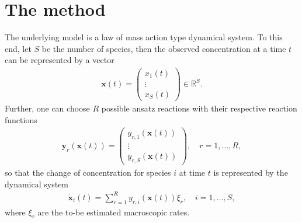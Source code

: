 \documentclass[oneside, abstracton, titlepage]{scrartcl}
\begin{document}
	\section{The method}
	The underlying model is a law of mass action type dynamical system. To this end, let $S$ be the number of species, then the observed concentration at a time $t$ can be represented by a vector
	\begin{align}
	\mathbf{x}(t)=\begin{pmatrix}
	x_1(t)\\ \vdots \\ x_S(t)
	\end{pmatrix}\in \mathbb{R}^S.
	\end{align}
	Further, one can choose $R$ possible ansatz reactions with their respective reaction functions
	\begin{align}
	\textbf{y}_r(\textbf{x}(t))=\begin{pmatrix}
	y_{r,1}(\textbf{x}(t)) \\ \vdots \\ y_{r,S}(\textbf{x}(t))
	\end{pmatrix},\quad r=1,\ldots,R,
	\end{align}
	so that the change of concentration for species $i$ at time $t$ is represented by the dynamical system
	\begin{align}
	\dot{\textbf{x}}_i(t) = \sum_{r=1}^{R}y_{r,i}(\textbf{x}(t))\xi_r,\quad i=1,\ldots, S,
	\label{method:the-system}\end{align}
	where $\xi_r$ are the to-be estimated macroscopic rates.
\end{document}
